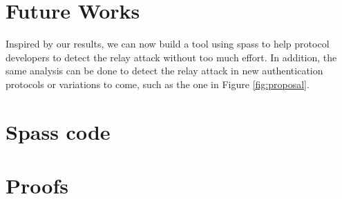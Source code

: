 \documentclass{article}
\begin{document}


\section{Future Works}
	
	Inspired by our results, we can now build a tool using spass to
	help protocol developers to detect the relay attack without too much
	effort. In addition, the same analysis can be done to detect the relay
	attack in new authentication protocols or variations to come, such as 
	the one in Figure \ref{fig:proposal}.

\appendix

\section{Spass code}
\lstset{basicstyle=\ttfamily\footnotesize,breaklines=true}



\section{Proofs}






\end{document}
